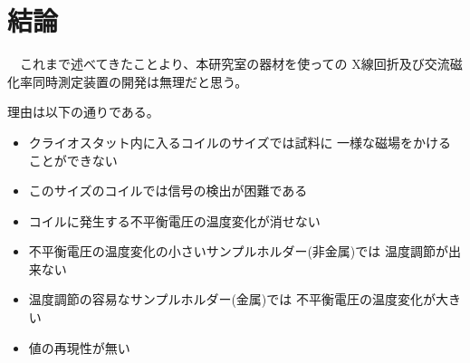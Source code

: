 \chapter{結論}

　これまで述べてきたことより、本研究室の器材を使っての
X線回折及び交流磁化率同時測定装置の開発は無理だと思う。


理由は以下の通りである。
\begin{itemize}
	\item クライオスタット内に入るコイルのサイズでは試料に
	一様な磁場をかけることができない
	\item このサイズのコイルでは信号の検出が困難である
	\item コイルに発生する不平衡電圧の温度変化が消せない
	\item 不平衡電圧の温度変化の小さいサンプルホルダー(非金属)では
	温度調節が出来ない
	\item 温度調節の容易なサンプルホルダー(金属)では
	不平衡電圧の温度変化が大きい
	\item 値の再現性が無い
\end{itemize}


